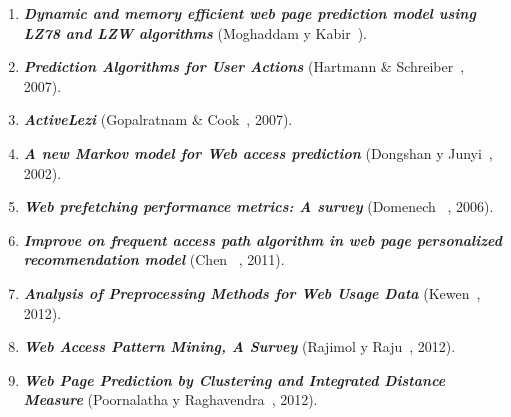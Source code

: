\vspace{1cm}
\begin{enumerate}

  \item \textbf{\emph{Dynamic and memory efficient web page prediction model using LZ78 and LZW algorithms}} (Moghaddam y Kabir~\cite{Moghaddam2009}). 


  \item \textbf{\emph{Prediction Algorithms for User Actions}} (Hartmann \& Schreiber~\cite{hartmann2007}, 2007). 
	
	
  \item \textbf{\emph{ActiveLezi}} (Gopalratnam  \& Cook~\cite{Gopalratnam2007}, 2007).  


  \item  \textbf{\emph{A new Markov model for Web access prediction}} (Dongshan y Junyi~\cite{Dongshan2002}, 2002). 
 
 
  \item \textbf{\emph{Web prefetching performance metrics: A survey}} (Domenech \etal~\cite{Domenech2006}, 2006). 
    
 
  \item \textbf{\emph{Improve on frequent access path algorithm in web page personalized recommendation model}} (Chen \etal~\cite{Chen2011}, 2011). 
  

  \item \textbf{\emph{Analysis of Preprocessing Methods for Web Usage Data}} (Kewen~\cite{kewen2012}, 2012). 


  \item \textbf{\emph{Web Access Pattern Mining, A Survey}} (Rajimol y Raju~\cite{Rajimol2012}, 2012). 
  

  \item \textbf{\emph{Web Page Prediction by Clustering and Integrated Distance Measure}} (Poornalatha y Raghavendra~\cite{Poornalatha2012}, 2012). 
  

  
\end{enumerate}





